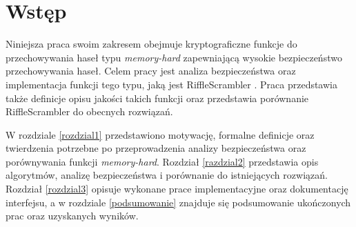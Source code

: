 \chapter{Wstęp}
\thispagestyle{chapterBeginStyle}


Niniejsza praca swoim zakresem obejmuje kryptograficzne funkcje do przechowywania haseł typu \textit{memory-hard} zapewniającą wysokie bezpieczeństwo przechowywania haseł.
Celem pracy jest analiza bezpieczeństwa oraz implementacja funkcji tego typu, jaką jest RiffleScrambler \cite{rs}. Praca przedstawia także definicje opisu jakości takich funkcji oraz przedstawia porównanie RiffleScrambler do obecnych rozwiązań.

W rozdziale \ref{rozdzial1} przedstawiono motywację, formalne definicje oraz twierdzenia potrzebne po przeprowadzenia analizy bezpieczeństwa oraz porównywania funkcji \textit{memory-hard}.
Rozdział \ref{razdzial2} przedstawia opis algorytmów, analizę bezpieczeństwa i porównanie do istniejących rozwiązań.
Rozdział \ref{rozdzial3} opisuje wykonane prace implementacyjne oraz dokumentację interfejsu, a w rozdziale \ref{podsumowanie} znajduje się podsumowanie ukończonych prac oraz uzyskanych wyników.

